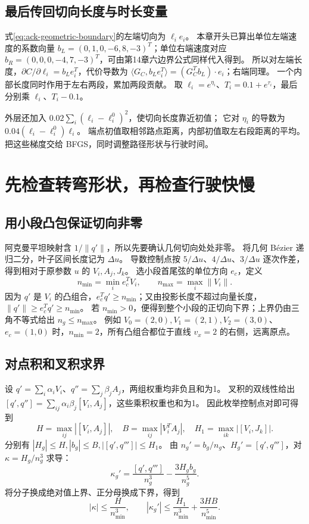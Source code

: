 \subsection{最后传回切向长度与时长变量}
式\eqref{eq:ack-geometric-boundary}的左端切向为 $\ell_ie_i$。
本章开头已算出单位左端速度的系数向量
$b_L=(0,1,0,-6,8,-3)^T$；单位右端速度对应
$b_R=(0,0,0,-4,7,-3)^T$，可由第14章六边界公式同样代入得到。
所以对左端长度，$\partial C/\partial\ell_i=b_Le_i^T$，代价导数为
$\langle G_C,b_Le_i^T\rangle=(G_C^Tb_L)\cdot e_i$；右端同理。
一个内部长度同时作用于左右两段，累加两段贡献。
取 $\ell_i=e^{\eta_i}$、$T_i=0.1+e^{\tau_i}$，最后分别乘 $\ell_i$、$T_i-0.1$。

外层还加入 $0.02\sum_i(\ell_i-\ell_i^0)^2$，使切向长度靠近初值；
它对 $\eta_i$ 的导数为 $0.04(\ell_i-\ell_i^0)\ell_i$。
端点初值取相邻路点距离，内部初值取左右段距离的平均。
 把这些梯度交给 BFGS，同时调整路径形状与行驶时间。

\section{先检查转弯形状，再检查行驶快慢}
\subsection{用小段凸包保证切向非零}
阿克曼平坦映射含 $1/\|q'\|$，所以先要确认几何切向处处非零。
将几何 Bézier 递归二分，叶子区间长度记为 $\Delta u$。
导数控制点按 $5/\Delta u$、$4/\Delta u$、$3/\Delta u$ 逐次作差，得到相对于原参数 $u$ 的 $V_i,A_j,J_k$。
选小段首尾弦的单位方向 $e_c$，定义
\[
 n_{\min}=\min_i e_c^TV_i,\qquad n_{\max}=\max_i\|V_i\|.
\]
因为 $q'$ 是 $V_i$ 的凸组合，$e_c^Tq'\ge n_{\min}$；又由投影长度不超过向量长度，
$\|q'\|\ge e_c^Tq'\ge n_{\min}$。
若 $n_{\min}>0$，便得到整个小段的正切向下界；上界仍由三角不等式给出 $n_g\le n_{\max}$。
例如 $V_0=(2,0),V_1=(2,1),V_2=(3,0)$、$e_c=(1,0)$ 时，$n_{\min}=2$，所有凸组合都位于直线 $v_x=2$ 的右侧，远离原点。

\subsection{对点积和叉积求界}
设 $q'=\sum_i\alpha_iV_i$、$q''=\sum_j\beta_jA_j$，两组权重均非负且和为1。
叉积的双线性给出
$[q',q'']=\sum_{ij}\alpha_i\beta_j[V_i,A_j]$，这些乘积权重也和为1。
因此枚举控制点对即可得到
\[
 H=\max_{ij}|[V_i,A_j]|,\quad B=\max_{ij}|V_i^TA_j|,\quad
 H_1=\max_{ik}|[V_i,J_k]|.
\]
分别有 $|H_g|\le H,|b_g|\le B,|[q',q''']|\le H_1$。
由 $n_g'=b_g/n_g$、$H_g'=[q',q''']$，对 $\kappa=H_g/n_g^3$ 求导：
\[
 \kappa_g'=\frac{[q',q''']}{n_g^3}-\frac{3H_gb_g}{n_g^5}.
\]
将分子换成绝对值上界、正分母换成下界，得到
\begin{equation}
 |\kappa|\le\frac H{n_{\min}^3},\qquad
 |\kappa_g'|\le\frac{H_1}{n_{\min}^3}+\frac{3HB}{n_{\min}^5}.
\end{equation}

